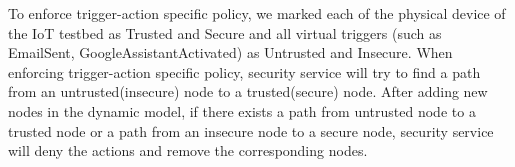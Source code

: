 %

To enforce trigger-action specific policy, we marked each of the physical device of the IoT testbed as Trusted and Secure and all virtual triggers (such as EmailSent, GoogleAssistantActivated) as Untrusted and Insecure. When enforcing trigger-action specific policy, security service will try to find a path from an untrusted(insecure) node to a trusted(secure) node.
After adding new nodes in the dynamic model, if there exists a path from untrusted node to a trusted node or a path from an insecure node to a secure node, security service will deny the actions and remove the corresponding nodes.





